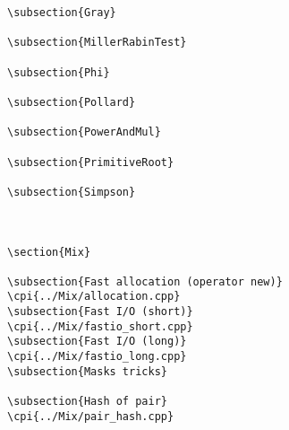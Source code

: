 {\begin{verbatim}
\subsection{Gray}

\subsection{MillerRabinTest}

\subsection{Phi}

\subsection{Pollard}

\subsection{PowerAndMul}

\subsection{PrimitiveRoot}

\subsection{Simpson}



\section{Mix}

\subsection{Fast allocation (operator new)}
\cpi{../Mix/allocation.cpp}
\subsection{Fast I/O (short)}
\cpi{../Mix/fastio_short.cpp}
\subsection{Fast I/O (long)}
\cpi{../Mix/fastio_long.cpp}
\subsection{Masks tricks}

\subsection{Hash of pair}
\cpi{../Mix/pair_hash.cpp}




\end{verbatim}}

